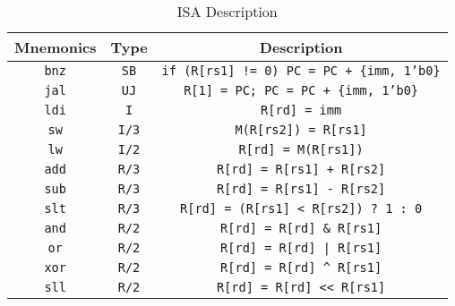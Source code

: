 \documentclass[a4paper]{article}
\begin{document}
\begin{table}[!h]
\centering
\caption{ISA Description}
\begin{tabular}{c c c}
\textbf{Mnemonics} & \textbf{Type} & \textbf{Description} \\ \hline \hline

\multicolumn{1}{|c|}{\texttt{bnz}} & \texttt{SB} & \multicolumn{1}{|c|}{\texttt{if (R[rs1] != 0) PC = PC + \{imm, 1'b0\}}}\\ \hline

\multicolumn{1}{|c|}{\texttt{jal}} & \texttt{UJ} & \multicolumn{1}{|c|}{\texttt{R[1] = PC; PC = PC + \{imm, 1'b0\}}}\\ \hline

\multicolumn{1}{|c|}{\texttt{ldi}} & \texttt{I} & \multicolumn{1}{|c|}{\texttt{R[rd] = imm}}\\ \hline\hline

\multicolumn{1}{|c|}{\texttt{sw}} & \texttt{I/3} & \multicolumn{1}{|c|}{\texttt{M(R[rs2]) = R[rs1]}}\\ \hline

\multicolumn{1}{|c|}{\texttt{lw}} & \texttt{I/2} & \multicolumn{1}{|c|}{\texttt{R[rd] = M(R[rs1])}}\\ \hline\hline

\multicolumn{1}{|c|}{\texttt{add}} & \texttt{R/3} & \multicolumn{1}{|c|}{\texttt{R[rd] = R[rs1] + R[rs2]}}\\ \hline

\multicolumn{1}{|c|}{\texttt{sub}} & \texttt{R/3} & \multicolumn{1}{|c|}{\texttt{R[rd] = R[rs1] - R[rs2]}}\\ \hline

\multicolumn{1}{|c|}{\texttt{slt}} & \texttt{R/3} & \multicolumn{1}{|c|}{\texttt{R[rd] = (R[rs1] < R[rs2]) ? 1 : 0}} \\ \hline \hline

\multicolumn{1}{|c|}{\texttt{and}} & \texttt{R/2} & \multicolumn{1}{|c|}{\texttt{R[rd] = R[rd] \& R[rs1]}}\\ \hline

\multicolumn{1}{|c|}{\texttt{or}} & \texttt{R/2} & \multicolumn{1}{|c|}{\texttt{R[rd] = R[rd] | R[rs1]}}\\ \hline

\multicolumn{1}{|c|}{\texttt{xor}} & \texttt{R/2} & \multicolumn{1}{|c|}{\texttt{R[rd] = R[rd] \^{} R[rs1]}}\\ \hline

\multicolumn{1}{|c|}{\texttt{sll}} & \texttt{R/2} & \multicolumn{1}{|c|}{\texttt{R[rd] = R[rd] << R[rs1]}}\\ \hline


\end{tabular}
\end{table}
\end{document}
